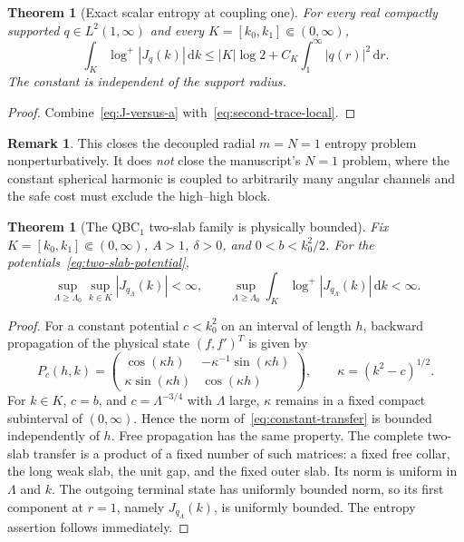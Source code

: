 \documentclass[11pt]{article}
\newcommand{\dd}{\,\mathrm d}
\newtheorem{theorem}[proposition]{Theorem}
\theoremstyle{definition}
\newtheorem{remark}[proposition]{Remark}
\begin{document}
\begin{theorem}[Exact scalar entropy at coupling one]
\label{thm:scalar-physical}
For every real compactly supported $q\in L^2(1,\infty)$ and every
$K=[k_0,k_1]\Subset(0,\infty)$,
\begin{equation}
 \int_K\log^+|J_q(k)|\dd k
 \leq |K|\log2+C_K\int_1^\infty|q(r)|^2\dd r.
 \label{eq:scalar-physical-entropy}
\end{equation}
The constant is independent of the support radius.
\end{theorem}

\begin{proof}
Combine~\eqref{eq:J-versus-a} with~\eqref{eq:second-trace-local}.
\end{proof}

\begin{remark}
This closes the decoupled radial $m=N=1$ entropy problem nonperturbatively.
It does \emph{not} close the manuscript's $N=1$ problem, where the constant
spherical harmonic is coupled to arbitrarily many angular channels and the
safe cost must exclude the high--high block.
\end{remark}

\begin{theorem}[The QBC$_1$ two-slab family is physically bounded]
\label{thm:two-slab-physical}
Fix $K=[k_0,k_1]\Subset(0,\infty)$, $A>1$, $\delta>0$, and
$0<b<k_0^2/2$.  For the potentials~\eqref{eq:two-slab-potential},
\begin{equation}
 \sup_{\Lambda\geq\Lambda_0}\sup_{k\in K}|J_{q_\Lambda}(k)|<\infty,
 \qquad
 \sup_{\Lambda\geq\Lambda_0}
 \int_K\log^+|J_{q_\Lambda}(k)|\dd k<\infty.
 \label{eq:two-slab-uniform}
\end{equation}
\end{theorem}

\begin{proof}
For a constant potential $c<k_0^2$ on an interval of length $h$, backward
propagation of the physical state $(f,f')^T$ is given by
\begin{equation}
 P_c(h,k)=
 \begin{pmatrix}
  \cos(\kappa h)&-\kappa^{-1}\sin(\kappa h)\\
  \kappa\sin(\kappa h)&\cos(\kappa h)
 \end{pmatrix},
 \qquad \kappa=(k^2-c)^{1/2}.
 \label{eq:constant-transfer}
\end{equation}
For $k\in K$, $c=b$, and $c=\Lambda^{-3/4}$ with $\Lambda$ large,
$\kappa$ remains in a fixed compact subinterval of $(0,\infty)$.  Hence the
norm of~\eqref{eq:constant-transfer} is bounded independently of $h$.
Free propagation has the same property.  The complete two-slab transfer is a
product of a fixed number of such matrices: a fixed free collar, the long weak
slab, the unit gap, and the fixed outer slab.  Its norm is uniform in
$\Lambda$ and $k$.  The outgoing terminal state has uniformly bounded norm,
so its first component at $r=1$, namely $J_{q_\Lambda}(k)$, is uniformly
bounded.  The entropy assertion follows immediately.
\end{proof}
\end{document}
